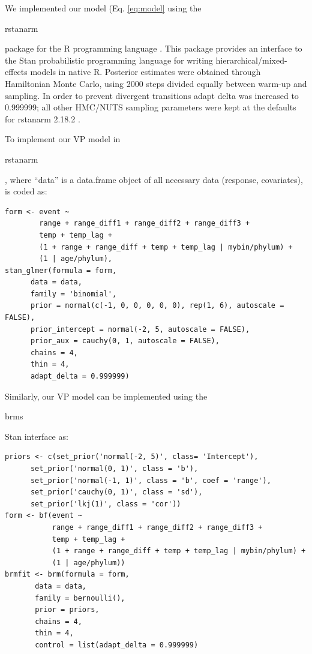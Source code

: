 \documentclass[12pt,letterpaper]{article}
\begin{document}
\begin{refsection}
We implemented our model (Eq. \ref{eq:model} using the \begin{texttt}rstanarm\end{texttt} package for the R programming language \citep{StanManual}. This package provides an interface to the Stan probabilistic programming language for writing hierarchical/mixed-effects models in native R. Posterior estimates were obtained through Hamiltonian Monte Carlo, using 2000 steps divided equally between warm-up and sampling. In order to prevent divergent transitions adapt delta was increased to 0.999999; all other HMC/NUTS sampling parameters were kept at the defaults for rstanarm 2.18.2 \citep{rstanarm}.

To implement our VP model in \begin{texttt}rstanarm\end{texttt}, where ``data'' is a data.frame object of all necessary data (response, covariates), is coded as:
\begin{verbatim}
form <- event ~ 
        range + range_diff1 + range_diff2 + range_diff3 + 
        temp + temp_lag + 
        (1 + range + range_diff + temp + temp_lag | mybin/phylum) + 
        (1 | age/phylum), 
stan_glmer(formula = form,
      data = data, 
      family = 'binomial',
      prior = normal(c(-1, 0, 0, 0, 0, 0), rep(1, 6), autoscale = FALSE), 
      prior_intercept = normal(-2, 5, autoscale = FALSE), 
      prior_aux = cauchy(0, 1, autoscale = FALSE), 
      chains = 4,
      thin = 4,
      adapt_delta = 0.999999)
\end{verbatim}

Similarly, our VP model can be implemented using the \begin{texttt}brms\end{texttt} Stan interface \citep{brms2017,brms2018} as:
\begin{verbatim}
priors <- c(set_prior('normal(-2, 5)', class= 'Intercept'),
      set_prior('normal(0, 1)', class = 'b'),
      set_prior('normal(-1, 1)', class = 'b', coef = 'range'),
      set_prior('cauchy(0, 1)', class = 'sd'),
      set_prior('lkj(1)', class = 'cor'))
form <- bf(event ~ 
           range + range_diff1 + range_diff2 + range_diff3 + 
           temp + temp_lag +
           (1 + range + range_diff + temp + temp_lag | mybin/phylum) +
           (1 | age/phylum))
brmfit <- brm(formula = form,
       data = data, 
       family = bernoulli(), 
       prior = priors,
       chains = 4, 
       thin = 4,
       control = list(adapt_delta = 0.999999)
\end{verbatim}


\end{refsection}
\end{document}
